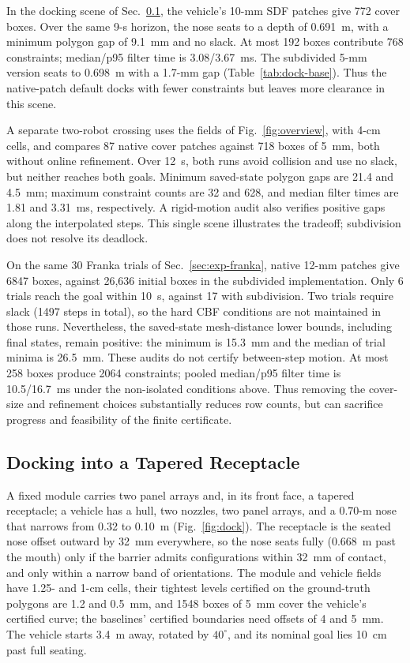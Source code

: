 \documentclass[journal]{IEEEtran}
\theoremstyle{definition}
\begin{document}
In the docking scene of Sec.~\ref{sec:exp-dock}, the vehicle's 10-mm SDF patches give 772 cover
boxes. Over the same 9-s horizon, the nose seats to a depth of 0.691~m, with a minimum polygon gap
of 9.1~mm and no slack. At most 192 boxes contribute 768 constraints; median/p95 filter time is
3.08/3.67~ms. The subdivided 5-mm version seats to 0.698~m with a 1.7-mm gap
(Table~\ref{tab:dock-base}). Thus the native-patch default docks with fewer constraints but leaves
more clearance in this scene.

A separate two-robot crossing uses the fields of Fig.~\ref{fig:overview}, with 4-cm cells,
and compares 87 native cover patches against 718 boxes of 5~mm, both without online refinement.
Over 12~s, both runs avoid collision and use no slack, but neither reaches both goals.
Minimum saved-state polygon gaps are 21.4 and 4.5~mm; maximum constraint counts are 32 and 628,
and median filter times are 1.81 and 3.31~ms, respectively. A rigid-motion audit also verifies
positive gaps along the interpolated steps. This single scene illustrates the tradeoff;
subdivision does not resolve its deadlock.

On the same 30 Franka trials of Sec.~\ref{sec:exp-franka}, native 12-mm patches give 6847 boxes,
against 26{,}636 initial boxes in the subdivided implementation. Only 6 trials reach the goal
within 10~s, against 17 with subdivision. Two trials require slack (1497 steps in total), so the
hard CBF conditions are not maintained in those runs. Nevertheless, the saved-state mesh-distance
lower bounds, including final states, remain positive: the minimum is 15.3~mm and the median of
trial minima is 26.5~mm. These audits do not certify between-step motion. At most 258 boxes produce
2064 constraints; pooled median/p95 filter time is 10.5/16.7~ms under the non-isolated conditions
above. Thus removing the cover-size and refinement choices substantially reduces row counts, but
can sacrifice progress and feasibility of the finite certificate.

\subsection{Docking into a Tapered Receptacle}\label{sec:exp-dock}
A fixed module carries two panel arrays and, in its front face, a tapered receptacle; a vehicle
has a hull, two nozzles, two panel arrays, and a 0.70-m nose that narrows from 0.32 to 0.10~m
(Fig.~\ref{fig:dock}). The receptacle is the seated nose offset outward by 32~mm everywhere, so the
nose seats fully (0.668~m past the mouth) only if the barrier admits configurations within 32~mm of
contact, and only within a narrow band of orientations. The module and vehicle fields have 1.25- and
1-cm cells, their tightest levels certified on the ground-truth polygons are 1.2 and 0.5~mm, and 1548
boxes of 5~mm cover the vehicle's certified curve; the baselines' certified boundaries need offsets
of 4 and 5~mm. The vehicle starts 3.4~m away, rotated by $40^\circ$, and its nominal goal lies 10~cm
past full seating.
\end{document}
